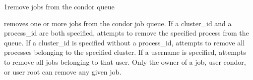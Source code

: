 \begin{ManPage}{}{1}{remove jobs from the condor queue}
\label{man-condor-rm}
\Synopsis {}

\Description

 removes one or more jobs from the condor job queue.  If a
cluster\_id and a process\_id are both specified,  attempts to
remove the specified process from the queue. If a cluster\_id is specified
without a process\_id,  attempts to remove all processes belonging
to the specified cluster. If a username is specified,  attempts to
remove all jobs belonging to that user. Only the owner of a job, user condor,
or user root can remove any given job.

\begin{Options}
\end{Options}

\end{ManPage}
